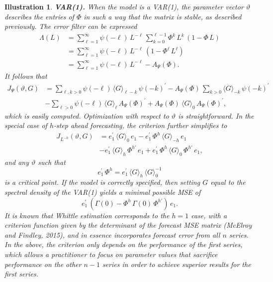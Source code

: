 \documentclass[a4paper]{book}
\newtheorem{Illustration}{Illustration}
\begin{document}
\vspace{.5cm}

\begin{Illustration} {\bf  VAR(1).}  \rm
\label{ill:var1.2}
When the model is a VAR(1), the parameter vector $\vartheta$
 describes the entries of $\Phi$ in such a way that the matrix is stable,
 as described previously.  The error filter can be 
 expressed
\begin{align*}
    \Lambda (L) & =   \sum_{\ell =1 }^{\infty} \psi (-\ell) \,  L^{-\ell} \,
   \sum_{k=0}^{\ell-1} \Phi^k \, L^k \, ( 1 - \Phi \, L )\\
  & =  \sum_{\ell =1 }^{\infty} \psi (-\ell) \,  L^{-\ell} \,
   \left( 1 - \Phi^{\ell} \, L^{\ell} \right)   \\
 & =   \sum_{\ell =1 }^{\infty} \psi (-\ell) \,  L^{-\ell} -
    A_{\Psi} (\Phi).
\end{align*}
  It follows that 
\begin{align*}
 J_{\Psi} (\vartheta, G) & = \sum_{\ell,k > 0} \psi (-\ell) \, {\langle G \rangle}_{\ell-k} \, 
	{\psi (-k)}^{\prime} - A_{\Psi} (\Phi) \, \sum_{k > 0} {\langle G \rangle}_{-k} 
	\, {\psi (-k)}^{\prime}  \\
  & - \sum_{\ell > 0} \psi (-\ell) \, { \langle G \rangle }_{\ell} \, 
	{ A_{\Psi} (\Phi) }^{\prime} + { A_{\Psi} (\Phi) }^{} \, { \langle G \rangle }_0 \,
 { A_{\Psi} (\Phi) }^{\prime},
\end{align*}
 which is easily computed.  Optimization with respect to $\vartheta$ is straightforward.
 In the special case of $h$-step ahead forecasting, the criterion further simplifies to
\begin{align*}
  J_{ L^{-h}} (\vartheta, G) & = 
  e_1^{\prime} \, { \langle G \rangle }_0 \, e_1 - e_1^{\prime} \, \Phi^h \, { \langle G \rangle}_{-h} 
	\, e_1 \\
 & - e_1^{\prime} \, {\langle G \rangle }_h \, {\Phi}^{h \prime} \, e_1
	+ e_1^{\prime} \, \Phi^h \, { \langle G \rangle }_0 \, {\Phi}^{h \prime} \, e_1,
\end{align*}
 and any $\vartheta$ such that
\[
  e_1^{\prime} \, \Phi^h = e_1^{\prime} \, { \langle G \rangle }_h \, { \langle G \rangle }_0^{-1}
\]
 is a critical point.  If the model is correctly specified, then setting $G$ equal to the spectral
 density of the VAR(1) yields a minimal possible MSE of
\[
   e_1^{\prime} \, \left( \Gamma (0) - \Phi^h \, \Gamma (0) \, {\Phi}^{h \prime} \right) \, e_1.
\]
 It is known that Whittle estimation corresponds to the $h=1$ case, 
 with a criterion function given
 by the determinant of the forecast MSE matrix (McElroy and Findley, 2015), and in essence
 incorporates forecast error from all $n$ series.  In the above, 
 the criterion only depends on the
 performance of the first series, which allows a practitioner to focus on parameter values
 that sacrifice performance on the other $n-1$ series in order to achieve superior results for
 the first series.
\end{Illustration}
\end{document}

